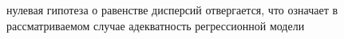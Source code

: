 нулевая гипотеза о равенстве дисперсий отвергается, что означает в рассматриваемом случае адекватность регрессионной модели